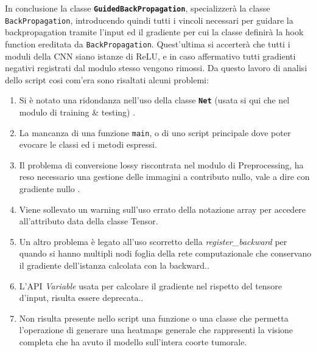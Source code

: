 In conclusione la classe \textbf{\texttt{GuidedBackPropagation}}, specializzerà la classe \texttt{BackPropagation},
introducendo quindi tutti i vincoli necessari per guidare la backpropagation tramite l'input ed il gradiente per cui 
la classe definirà la hook function ereditata da \texttt{BackPropagation}. Quest'ultima si accerterà che tutti i 
moduli della CNN siano istanze di ReLU, e in caso affermativo tutti gradienti negativi registrati dal modulo stesso
vengono rimossi. Da questo lavoro di analisi dello script cosi com'era sono risaltati alcuni problemi:
\begin{enumerate}
    \item Si è notato una ridondanza nell'uso della classe \textbf{\texttt{Net}} 
          (usata si qui che nel modulo di training \& testing) \label{appendix2.5:1}.
    \item La mancanza di una funzione \texttt{main}, o di uno script  principale dove poter evocare le classi ed 
          i metodi espressi\label{appendix2.5:2}.
    \item Il problema di conversione lossy riscontrata nel modulo di Preprocessing, ha reso necessario una gestione
          delle immagini a contributo nullo, vale a dire con gradiente nullo \label{appendix2.5:3}.
    \item Viene sollevato un warning sull'uso errato della notazione array per accedere all'attributo data della 
          classe Tensor\label{appendix2.5:4}.
    \item Un altro problema è legato all'uso scorretto della \textit{register\_backward} per quando si hanno 
          multipli nodi foglia della rete computazionale che conservano il gradiente dell'istanza calcolata con 
          la backward.\label{appendix2.5:5}.
    \item L'API \textit{Variable} usata \cite{lyu2018deep} per calcolare il gradiente nel rispetto del tensore d'input,
          risulta essere deprecata.\label{appendix2.5:6}.
    \item Non risulta presente nello script una funzione o una classe che permetta l'operazione di generare una 
          heatmaps generale che rappresenti la visione completa che ha avuto il modello sull'intera coorte
          tumorale\label{appendix2.5:7}.
\end{enumerate}

